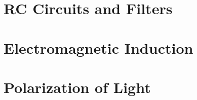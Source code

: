 \documentclass[12pt,letterpaper]{book}
\begin{document}
\chapter{RC Circuits and Filters}


\chapter{Electromagnetic Induction}


\chapter{Polarization of Light}
\label{ch:pol} %


% 

% 

% 




    
\end{document}
